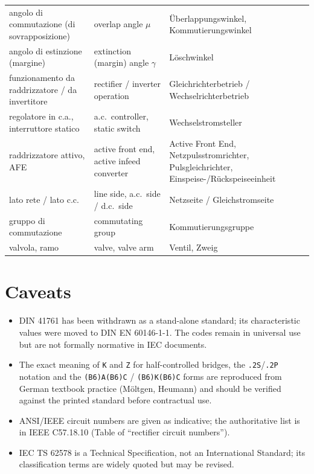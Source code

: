 \documentclass[11pt,a4paper]{article}
\newcommand{\code}[1]{\texttt{#1}}
\begin{document}
\begin{longtable}{p{4.6cm}p{4.8cm}p{5cm}}
angolo di commutazione (di sovrapposizione) & overlap angle $\mu$ & Überlappungswinkel, Kommutierungswinkel \\
angolo di estinzione (margine) & extinction (margin) angle $\gamma$ & Löschwinkel \\
funzionamento da raddrizzatore / da invertitore & rectifier / inverter operation & Gleichrichterbetrieb / Wechselrichterbetrieb \\
regolatore in c.a., interruttore statico & a.c.\ controller, static switch & Wechselstromsteller \\
raddrizzatore attivo, AFE & active front end, active infeed converter & Active Front End, Netzpulsstromrichter, Pulsgleichrichter, Einspeise-/Rückspeiseeinheit \\
lato rete / lato c.c. & line side, a.c.\ side / d.c.\ side & Netzseite / Gleichstromseite \\
gruppo di commutazione & commutating group & Kommutierungsgruppe \\
valvola, ramo & valve, valve arm & Ventil, Zweig \\
\bottomrule
\end{longtable}

\section{Caveats}

\begin{itemize}
\item DIN 41761 has been withdrawn as a stand-alone standard; its characteristic values were moved to DIN EN 60146-1-1. The codes remain in universal use but are not formally normative in IEC documents.
\item The exact meaning of \code{K} and \code{Z} for half-controlled bridges, the \code{.2S}/\code{.2P} notation and the \code{(B6)A(B6)C} / \code{(B6)K(B6)C} forms are reproduced from German textbook practice (Möltgen, Heumann) and should be verified against the printed standard before contractual use.
\item ANSI/IEEE circuit numbers are given as indicative; the authoritative list is in IEEE C57.18.10 (Table of ``rectifier circuit numbers'').
\item IEC TS 62578 is a Technical Specification, not an International Standard; its classification terms are widely quoted but may be revised.
\end{itemize}
\end{document}
